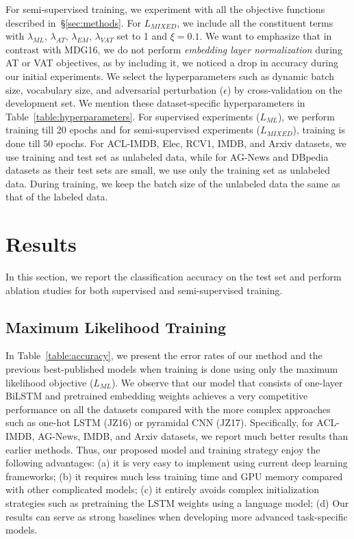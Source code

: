 \documentclass[letterpaper]{article}
\begin{document}
For semi-supervised training, we experiment with all the objective functions described in~\S\ref{sec:methods}. For $L_{\textit{MIXED}}$, we include all the constituent terms with $\lambda_{\textit{ML}}$, $\lambda_{\textit{AT}}$, $\lambda_{\textit{EM}}$, $\lambda_{\textit{VAT}}$ set to 1 and $\xi=0.1$. We want to emphasize that in contrast with MDG16, we do not perform \emph{embedding layer normalization} during AT or VAT objectives, as by including it, we noticed a drop in accuracy during our initial experiments. We select the hyperparameters such as dynamic batch size, vocabulary size, and adversarial perturbation ($\epsilon$) by cross-validation on the development set. We mention these dataset-specific hyperparameters in Table~\ref{table:hyperparameters}. For supervised experiments ($L_{\textit{ML}}$), we perform training till 20 epochs and for semi-supervised experiments ($L_{\textit{MIXED}}$), training is done till 50 epochs. For ACL-IMDB, Elec, RCV1, IMDB, and Arxiv datasets, we use training and test set as unlabeled data, while for AG-News and DBpedia datasets as their test sets are small, we use only the training set as unlabeled data. During training, we keep the batch size of the unlabeled data the same as that of the labeled data.

\section{Results}
\label{sec:results}
In this section, we report the classification accuracy on the test set and perform ablation studies for both supervised and semi-supervised training.

\subsection{Maximum Likelihood Training}
In Table~\ref{table:accuracy}, we present the error rates of our method and the previous best-published models when training is done using only the maximum likelihood objective ($L_{\textit{ML}}$). We observe that our model that consists of one-layer BiLSTM and pretrained embedding weights achieves a very competitive performance on all the datasets compared with the more complex approaches such as one-hot LSTM (JZ16) or pyramidal CNN (JZ17). Specifically, for ACL-IMDB, AG-News, IMDB, and Arxiv datasets, we report much better results than earlier methods. Thus, our proposed model and training strategy enjoy the following advantages: (a) it is very easy to implement using current deep learning frameworks; (b) it requires much less training time and GPU memory compared with other complicated models; (c) it entirely avoids complex initialization strategies such as pretraining the LSTM weights using a language model; (d) Our results can serve as strong baselines when developing more advanced task-specific models.
\end{document}
